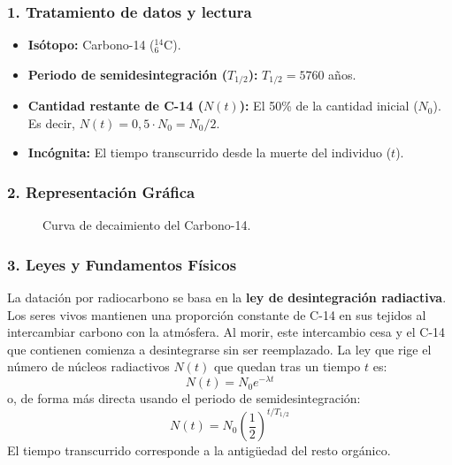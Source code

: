 \subsubsection*{1. Tratamiento de datos y lectura}
\begin{itemize}
    \item \textbf{Isótopo:} Carbono-14 (${}_6^{14}\text{C}$).
    \item \textbf{Periodo de semidesintegración ($T_{1/2}$):} $T_{1/2} = 5760$ años.
    \item \textbf{Cantidad restante de C-14 ($N(t)$):} El 50\% de la cantidad inicial ($N_0$). Es decir, $N(t) = 0,5 \cdot N_0 = N_0/2$.
    \item \textbf{Incógnita:} El tiempo transcurrido desde la muerte del individuo ($t$).
\end{itemize}

\subsubsection*{2. Representación Gráfica}
\begin{figure}[H]
    \centering
    \caption{Curva de decaimiento del Carbono-14.}
\end{figure}

\subsubsection*{3. Leyes y Fundamentos Físicos}
La datación por radiocarbono se basa en la \textbf{ley de desintegración radiactiva}. Los seres vivos mantienen una proporción constante de C-14 en sus tejidos al intercambiar carbono con la atmósfera. Al morir, este intercambio cesa y el C-14 que contienen comienza a desintegrarse sin ser reemplazado.
La ley que rige el número de núcleos radiactivos $N(t)$ que quedan tras un tiempo $t$ es:
$$ N(t) = N_0 e^{-\lambda t} $$
o, de forma más directa usando el periodo de semidesintegración:
$$ N(t) = N_0 \left(\frac{1}{2}\right)^{t/T_{1/2}} $$
El tiempo transcurrido corresponde a la antigüedad del resto orgánico.

